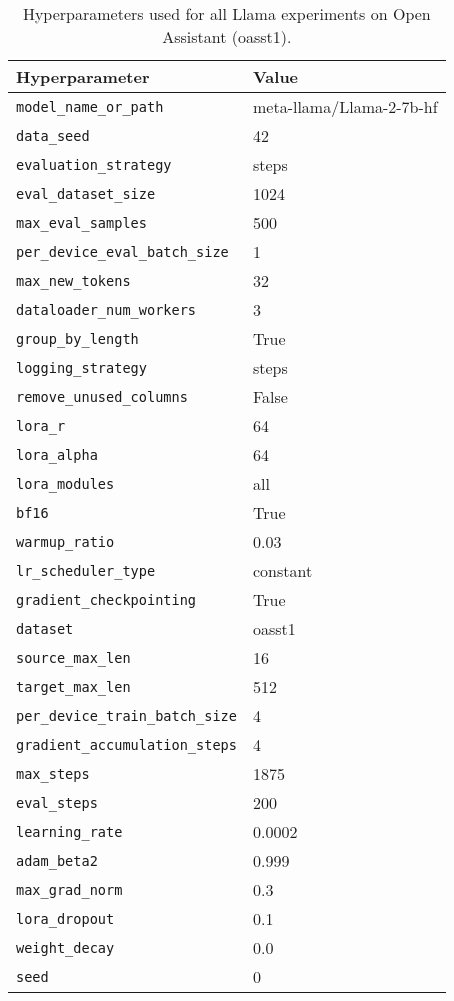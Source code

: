 \begin{table}[ht!]
\centering
\begin{tabular}{ll}
\toprule
\textbf{Hyperparameter} & \textbf{Value} \\
\midrule
\texttt{model\_name\_or\_path}      & meta-llama/Llama-2-7b-hf \\
\texttt{data\_seed}                 & 42 \\
\texttt{evaluation\_strategy}       & steps \\
\texttt{eval\_dataset\_size}        & 1024 \\
\texttt{max\_eval\_samples}         & 500 \\
\texttt{per\_device\_eval\_batch\_size} & 1 \\
\texttt{max\_new\_tokens}           & 32 \\
\texttt{dataloader\_num\_workers}   & 3 \\
\texttt{group\_by\_length}          & True \\
\texttt{logging\_strategy}          & steps \\
\texttt{remove\_unused\_columns}    & False \\
\texttt{lora\_r}                    & 64 \\
\texttt{lora\_alpha}                & 64 \\
\texttt{lora\_modules}              & all \\
\texttt{bf16}                       & True \\
\texttt{warmup\_ratio}              & 0.03 \\
\texttt{lr\_scheduler\_type}        & constant \\
\texttt{gradient\_checkpointing}    & True \\
\texttt{dataset}                    & oasst1 \\
\texttt{source\_max\_len}           & 16 \\
\texttt{target\_max\_len}           & 512 \\
\texttt{per\_device\_train\_batch\_size} & 4 \\
\texttt{gradient\_accumulation\_steps}   & 4 \\
\texttt{max\_steps}                 & 1875 \\
\texttt{eval\_steps}                & 200 \\
\texttt{learning\_rate}             & 0.0002 \\
\texttt{adam\_beta2}                & 0.999 \\
\texttt{max\_grad\_norm}            & 0.3 \\
\texttt{lora\_dropout}              & 0.1 \\
\texttt{weight\_decay}              & 0.0 \\
\texttt{seed}                       & 0 \\
\bottomrule
\end{tabular}
\caption{Hyperparameters used for all Llama experiments on Open Assistant (oasst1).}
\label{tab:qlora_hparams}
\end{table}


\newpage